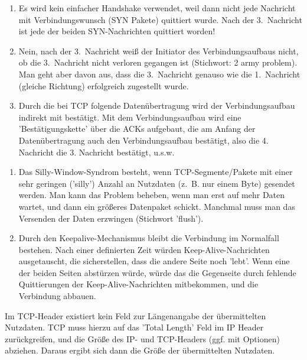 
\begin{enumerate}
    \item Es wird kein einfacher Handshake verwendet, weil dann nicht jede Nachricht mit Verbindungswunsch (SYN Pakete) quittiert wurde.
    Nach der 3.\ Nachricht ist jede der beiden SYN-Nachrichten quittiert worden!
    \item Nein, nach der 3.\ Nachricht weiß der Initiator des Verbindungsaufbaus nicht, ob die 3.\ Nachricht nicht verloren gegangen ist (Stichwort: 2 army problem).
    Man geht aber davon aus, dass die 3.\ Nachricht genauso wie die 1.\ Nachricht (gleiche Richtung) erfolgreich zugestellt wurde.
    \item Durch die bei TCP folgende Datenübertragung wird der Verbindungsaufbau indirekt mit bestätigt.
    Mit dem Verbindungsaufbau wird eine 'Bestätigungskette' über die ACKs aufgebaut, die am Anfang der Datenübertragung auch den Verbindungsaufbau bestätigt, also die 4. Nachricht die 3. Nachricht bestätigt, u.s.w.
\end{enumerate}

\begin{enumerate}
    \item Das Silly-Window-Syndrom besteht, wenn TCP-Segmente/Pakete mit einer sehr geringen ('silly') Anzahl an Nutzdaten (z.\ B. nur einem Byte) gesendet werden.
    Man kann das Problem beheben, wenn man erst auf mehr Daten wartet, und dann ein größeres Datenpaket schickt.
    Manchmal muss man das Versenden der Daten erzwingen (Stichwort 'flush').
    \item Durch den Keepalive-Mechanismus bleibt die Verbindung im Normalfall bestehen.
    Nach einer definierten Zeit würden Keep-Alive-Nachrichten ausgetauscht, die sicherstellen, dass die andere Seite noch 'lebt'.
    Wenn eine der beiden Seiten abstürzen würde, würde das die Gegenseite durch fehlende Quittierungen der Keep-Alive-Nachrichten mitbekommen, und die Verbindung abbauen.
\end{enumerate}

Im TCP-Header existiert kein Feld zur Längenangabe der übermittelten Nutzdaten.
TCP muss hierzu auf das 'Total Length' Feld im IP Header zurückgreifen, und die Größe des IP- und TCP-Headers (ggf. mit Optionen) abziehen.
Daraus ergibt sich dann die Größe der übermittelten Nutzdaten.


